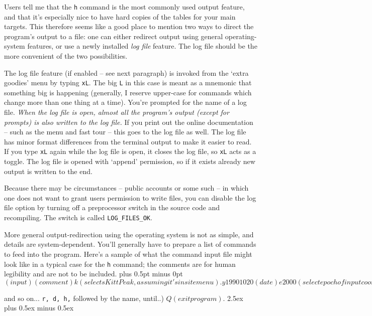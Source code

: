
Users tell me that the {\tt h} command is the most commonly
used output feature, and that it's especially nice to have hard copies
of the tables for your main targets.
This therefore seems like a good place to mention
two ways to direct the program's output to a file:
one can either redirect output
using general operating-system features, or use a newly installed
{\it log file} feature.  The log file should be the more
convenient of the two possibilities.
  
The log file feature (if enabled -- see next paragraph) 
is invoked from the `extra goodies' menu by
typing {\tt xL}.  The big {\tt L} in this case is meant as a mnemonic
that something big is happening (generally, I reserve upper-case
for commands which change more than one thing at a time).  You're
prompted for the name of a log file.  {\it When the log file is
open, almost all the program's
output (except for prompts) is also written to the log file.}
If you print out the online documentation -- such as the menu and fast tour  --
this goes to the log file as well.  
The log file has minor format differences from the terminal output to 
make it easier to read.  If you type {\tt xL} again while the log file
is open, it closes the log file, so {\tt xL} acts as a toggle.  The
log file is opened with `append' permission, so if it exists already
new output is written to the end. 

Because there may be circumstances -- public accounts or some such --
in which one does not want to grant users
permission to write files, you can disable the log file option
by turning off a preprocessor switch in the
source code and recompiling.  The switch is called {\tt LOG\_FILES\_OK}.

More general output-redirection using the operating system is not
as simple, and 
details are system-dependent.  You'll
generally have to prepare a list of commands to feed into the
program.  Here's a sample
of what the command input file might look like in a typical case
for the {\tt h} command; the comments are for human legibility
and are not to be included.
\parskip 0pt plus 0.5pt minus 0pt
\verbatim$

(input)               (comment)

k                     (selects Kitt Peak, assuming it's in site menu).
y 1990 10 20            (date)
e 2000                (select epoch of input coordinates)
r 19 19 19            (coordinates .. ra and dec).
d 2 2 2	
h                     (hourly circumstances command)
Wholeflaffer 9	      (name of object .. the output will follow.)
r 20 20 20            (for next object)
d 12 12 12	
h
Flapdoodle's Variable Nebula
$
\medskip
\par
and so on... {\tt r, d, h,} 
followed by the name, until..)
\medskip
\verbatim$
Q              (exit program).	
$
\parskip 2.5ex plus 0.5ex minus 0.5ex


